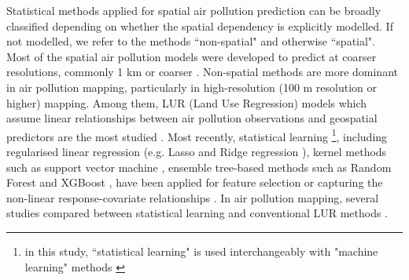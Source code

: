 \documentclass{article}
\begin{document}

Statistical methods applied for spatial air pollution prediction can be broadly classified depending on whether the spatial dependency is explicitly modelled. If not modelled, we refer to the methods ``non-spatial" and otherwise ``spatial". Most of the spatial air pollution models were developed to predict at coarser resolutions, commonly 1 km or coarser \citep{young2016satellite,shaddick2018data,BELOCONI2020105578}. Non-spatial methods are more dominant in air pollution mapping, particularly in high-resolution (100 m resolution or higher) mapping. Among them, LUR (Land Use Regression) models which assume linear relationships between air pollution observations and geospatial predictors are the most studied \citep{briggs2000regression,hoek2008review}. Most recently, statistical learning \footnote{in this study, ``statistical learning" is used interchangeably with "machine learning" methods \citep{hastie2009elements}}, including regularised linear regression (e.g. Lasso and Ridge regression \citep{James2013introduction}), kernel methods such as support vector machine \citep{svm1999least}, ensemble tree-based methods such as Random Forest \citep[RF,][]{breiman2001random} and XGBoost \citep[XGB,][]{chen2016xgboost}, have been applied for feature selection or capturing the non-linear response-covariate relationships \citep{luglobal,chen2019comparison}. In air pollution mapping, several studies compared between statistical learning and conventional LUR methods  \citep{chen2019comparison,kerckhoffs2019performance,luglobal,REN2020105827,machinereview}.
\end{document}
